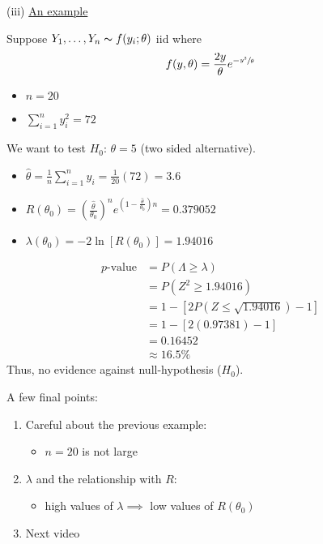 (iii) \underline{An example}
\begin{exbox}
    \begin{example}
        Suppose $ Y_1,\ldots ,Y_n \thicksim f(y_i;\theta) $ iid where
        \[ f(y,\theta)=\frac{2y}{\theta}e^{-\sfrac{y^2}{\theta}} \]
        \begin{itemize}
            \item $ n=20 $
            \item $ \sum\limits_{i=1}^{n} y_i^2=72 $
        \end{itemize}

        We want to test $ H_0 $: $ \theta=5 $ (two sided alternative).
        \begin{itemize}
            \item $ \hat{\theta}=\frac{1}{n} \sum\limits_{i=1}^{n}y_i=\frac{1}{20}(72)=3.6 $
            \item $ R(\theta_0)=\left( \frac{\hat{\theta}}{\theta_0} \right)^n
                      e^{\left(1-\frac{\hat{\theta}}{\theta_0}\right)n} = 0.379052 $
            \item $ \lambda(\theta_0) =-2\ln \left[ R(\theta_0) \right]=1.94016 $
        \end{itemize}
        \begin{align*}
            p\text{-value}
             & =P(\Lambda\geqslant \lambda)                       \\
             & =P(Z^2\geqslant 1.94016)                           \\
             & =1-\left[ 2 P(Z\leqslant \sqrt{1.94016})-1 \right] \\
             & = 1-\left[ 2(0.97381)-1 \right]                    \\
             & = 0.16452                                          \\
             & \approx 16.5\%
        \end{align*}
        Thus, no evidence against null-hypothesis ($ H_0 $).
    \end{example}
\end{exbox}
A few final points:
\begin{enumerate}[label=(\roman*)]
    \item Careful about the previous example:
          \begin{itemize}
              \item $ n=20 $ is not large
          \end{itemize}
    \item $ \lambda $ and the relationship with $ R $:
          \begin{itemize}
              \item high values of $ \lambda\implies $ low values of $ R(\theta_0) $
          \end{itemize}
    \item Next video
\end{enumerate}

